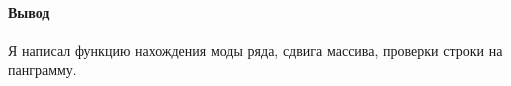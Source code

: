 \paragraph{Вывод}
Я написал функцию нахождения моды ряда, сдвига массива, проверки строки на панграмму.